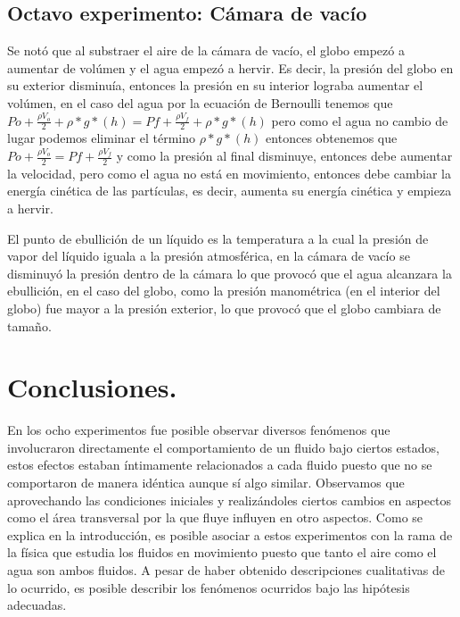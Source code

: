 \documentclass[10pt,a4paper]{article}
\begin{document}
\subsection*{Octavo experimento: Cámara de vacío}

Se notó que al substraer el aire de la cámara de vacío, el globo empezó a aumentar de volúmen y el agua empezó a hervir.
Es decir, la presión del globo en su exterior disminuía, entonces la presión en su interior lograba aumentar el volúmen, en el caso del agua por la ecuación de Bernoulli tenemos que $Po+ \frac{\rho V_o}{2}+ \rho* g*(h)=Pf+ \frac{\rho V_f}{2}+ \rho* g*(h)$  pero como el agua no cambio de lugar podemos eliminar el término $\rho* g*(h)$ entonces obtenemos que $Po+ \frac{\rho V_o}{2}=Pf+ \frac{\rho V_f}{2}$ y como la presión al final disminuye, entonces debe aumentar la velocidad, pero como el agua no está en movimiento, entonces debe cambiar la energía cinética de las partículas, es decir, aumenta su energía cinética y empieza a hervir.

El punto de ebullición de un líquido es la temperatura a la cual la presión de vapor del líquido iguala a la presión atmosférica, en la cámara de vacío se disminuyó la presión dentro de la cámara lo que provocó que el agua alcanzara la ebullición, en el caso del globo, como la presión manométrica (en el interior del globo) fue mayor a la presión exterior, lo que provocó que el globo cambiara de tamaño.








\section{Conclusiones.}
En los ocho experimentos fue posible observar diversos fenómenos que involucraron directamente el comportamiento de un fluido bajo ciertos estados, estos efectos estaban íntimamente relacionados a cada fluido puesto que no se comportaron de manera idéntica aunque sí algo similar. Observamos que aprovechando las condiciones iniciales y realizándoles ciertos cambios en aspectos como el área transversal por la que fluye influyen en otro aspectos. Como se explica en la introducción, es posible asociar a estos experimentos con la rama de la física que estudia los fluidos en movimiento puesto que tanto el aire como el agua son ambos fluidos. A pesar de haber obtenido descripciones cualitativas de lo ocurrido, es posible describir los fenómenos ocurridos bajo las hipótesis adecuadas. 
\end{document}
